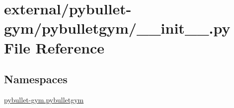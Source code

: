 \hypertarget{external_2pybullet-gym_2pybulletgym_2____init_____8py}{}\section{external/pybullet-\/gym/pybulletgym/\+\_\+\+\_\+init\+\_\+\+\_\+.py File Reference}
\label{external_2pybullet-gym_2pybulletgym_2____init_____8py}
\subsection*{Namespaces}
\begin{DoxyCompactItemize}
\item 
 \hyperlink{namespacepybullet-gym_1_1pybulletgym}{pybullet-\/gym.\+pybulletgym}
\end{DoxyCompactItemize}
